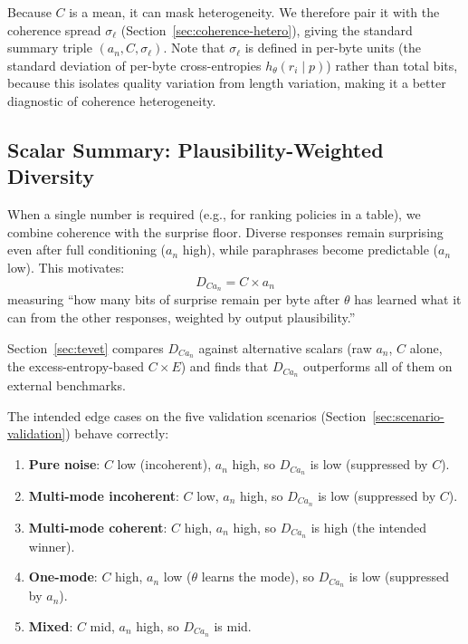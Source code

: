 Because $C$ is a mean, it can mask heterogeneity.
We therefore pair it with the coherence spread $\sigma_\ell$ (Section~\ref{sec:coherence-hetero}), giving the standard summary triple $(a_n, C, \sigma_\ell)$.
Note that $\sigma_\ell$ is defined in per-byte units (the standard deviation of per-byte cross-entropies $h_\theta(r_i \mid p)$) rather than total bits, because this isolates quality variation from length variation, making it a better diagnostic of coherence heterogeneity.

\subsection{Scalar Summary: Plausibility-Weighted Diversity}\label{sec:scalar}

When a single number is required (e.g., for ranking policies in a table), we combine coherence with the surprise floor.
Diverse responses remain surprising even after full conditioning ($a_n$ high), while paraphrases become predictable ($a_n$ low).
This motivates:
\begin{equation}\label{eq:D-ainf}
    D_{Ca_n} = C \times a_n
\end{equation}
measuring ``how many bits of surprise remain per byte after $\theta$ has learned what it can from the other responses, weighted by output plausibility.''

Section~\ref{sec:tevet} compares $D_{Ca_n}$ against alternative scalars (raw $a_n$, $C$ alone, the excess-entropy-based $C \times E$) and finds that $D_{Ca_n}$ outperforms all of them on external benchmarks.

The intended edge cases on the five validation scenarios (Section~\ref{sec:scenario-validation}) behave correctly:
\begin{enumerate}[nosep]
    \item \textbf{Pure noise}: $C$ low (incoherent), $a_n$ high, so $D_{Ca_n}$ is low (suppressed by $C$).
    \item \textbf{Multi-mode incoherent}: $C$ low, $a_n$ high, so $D_{Ca_n}$ is low (suppressed by $C$).
    \item \textbf{Multi-mode coherent}: $C$ high, $a_n$ high, so $D_{Ca_n}$ is high (the intended winner).
    \item \textbf{One-mode}: $C$ high, $a_n$ low ($\theta$ learns the mode), so $D_{Ca_n}$ is low (suppressed by $a_n$).
    \item \textbf{Mixed}: $C$ mid, $a_n$ high, so $D_{Ca_n}$ is mid.
\end{enumerate}

